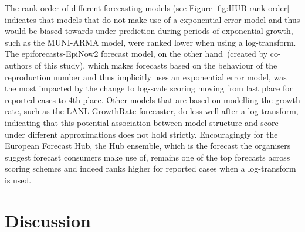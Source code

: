 \documentclass{article}
\begin{document}
The rank order of different forecasting models (see Figure \ref{fig:HUB-rank-order} indicates that models that do not make use of a exponential error model and thus would be biased towards under-prediction during periods of exponential growth, such as the MUNI-ARMA model, were ranked lower when using a log-transform. The epiforecasts-EpiNow2 forecast model, on the other hand~(created by co-authors of this study), which makes forecasts based on the behaviour of the reproduction number and thus implicitly uses an exponential error model, was the most impacted by the change to log-scale scoring moving from last place for reported cases to 4th place. Other models that are based on modelling the growth rate, such as the LANL-GrowthRate forecaster, do less well after a log-transform, indicating that this potential association between model structure and score under different approximations does not hold strictly. Encouragingly for the European Forecast Hub, the Hub ensemble, which is the forecast the organisers suggest forecast consumers make use of, remains one of the top forecasts across scoring schemes and indeed ranks higher for reported cases when a log-transform is used.




\section{Discussion}
\label{sec:discussion}
\end{document}
